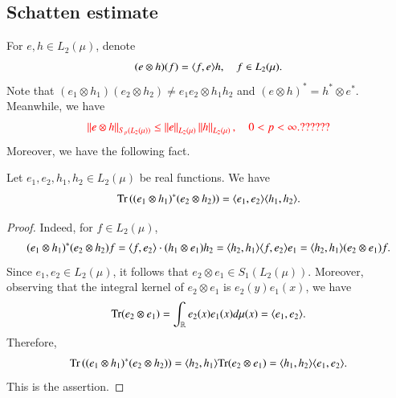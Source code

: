 \documentclass[leqno]{amsart}
\begin{document}
\subsection{Schatten estimate}
For $e,h\in L_{2}(\mu)$, denote $$(e\otimes h)(f)=\langle f,e \rangle h,\quad f\in L_{2}(\mu).$$
Note that $(e_{1}\otimes h_{1})(e_{2}\otimes h_{2})\neq e_{1}e_{2}\otimes h_{1}h_{2}$ and $(e\otimes h)^{*}= h^{*}\otimes e^{*}$. Meanwhile, we have
\begin{align*}
{\color{red} \left\| e\otimes h \right\| _{S_{p}(L_{2}(\mu))}\leq \left\| e \right\| _{L_{2}(\mu)} \left\| h \right\| _{L_{2}(\mu)},
\quad 0<p<\infty.??????}
\end{align*}
Moreover, we have the following fact.
\begin{lemma}\label{tensor Sp}
Let $e_{1},e_{2},h_{1},h_{2}\in L_{2}(\mu)$ be real functions. We have
$${\rm Tr}\left((e_{1}\otimes h_{1})^{*}(e_{2}\otimes h_{2})\right)=\langle e_{1},e_{2} \rangle\langle h_{1},h_{2} \rangle.$$
\end{lemma} 
\begin{proof}
Indeed, for $f\in L_{2}(\mu)$,
\begin{align*}
(e_{1}\otimes h_{1})^{*}(e_{2}\otimes h_{2})f
=\langle f,e_{2} \rangle\cdot(h_{1}\otimes e_{1}) h_{2}
=\langle h_{2},h_{1} \rangle\langle f,e_{2} \rangle e_{1}
=\langle h_{2},h_{1} \rangle(e_{2}\otimes e_{1})f.
\end{align*}
Since $e_{1},e_{2}\in L_{2}(\mu)$, it follows that $e_{2}\otimes e_{1}\in S_{1}(L_{2}(\mu))$. Moreover, observing that the integral kernel of $e_{2}\otimes e_{1}$ is $e_{2}(y)e_{1}(x)$, we have
\begin{align*}
{\rm Tr}(e_{2}\otimes e_{1})=\int_{{\mathbb R}}e_{2}(x)e_{1}(x)d\mu(x)=\langle e_{1},e_{2} \rangle.
\end{align*}
Therefore,
\begin{align*}
{\rm Tr}\left((e_{1}\otimes h_{1})^{*}(e_{2}\otimes h_{2})\right)
=\langle h_{2},h_{1} \rangle{\rm Tr}(e_{2}\otimes e_{1})
=\langle h_{1},h_{2} \rangle\langle e_{1},e_{2} \rangle.
\end{align*}
This is the assertion.
\end{proof}
\end{document}
